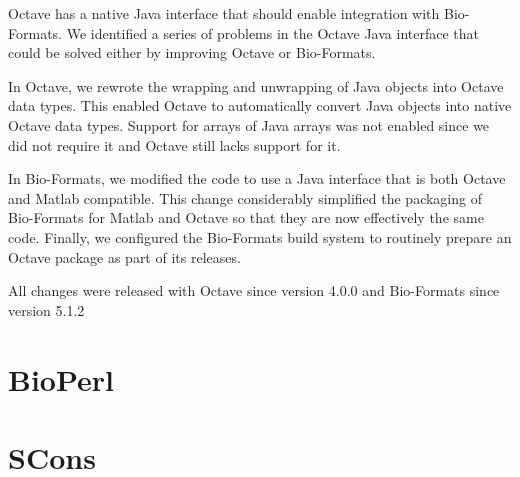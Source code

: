 Octave has a native Java interface that should enable integration with
Bio-Formats.
We identified a series of problems in the Octave Java interface that
could be solved either by improving Octave or Bio-Formats.

In Octave, we rewrote the wrapping and unwrapping of Java objects 
into Octave data types.  This enabled Octave to automatically
convert Java objects into native Octave data types.
Support for arrays of Java arrays was not enabled
since we did not require it and Octave still lacks
support for it.

In Bio-Formats, we modified the code to use a Java interface that is
both Octave and Matlab compatible.
This change considerably  simplified the packaging of
Bio-Formats for Matlab and Octave so that they are now
effectively the same code.
Finally, we configured the Bio-Formats build system 
to routinely prepare an Octave package as part of its releases.

All changes were released with Octave since version 4.0.0 and
Bio-Formats since version 5.1.2

\section{BioPerl}

\section{SCons}

